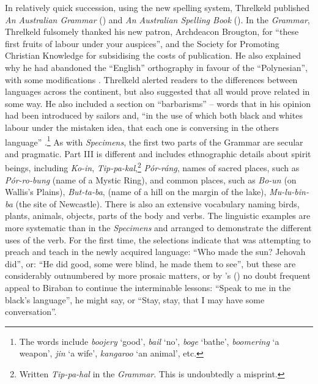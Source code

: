 {In relatively quick succession, using the new spelling system, Threlkeld published \textit{An Australian Grammar} (\citeyear{threlkeld_australian_1834}) and \textit{An Australian Spelling Book} (\citeyear{threlkeld_australian_1836}). In the \textit{Grammar}, Threlkeld fulsomely thanked his new patron, Archdeacon Brougton, for “these first fruits of labour under your auspices”, and the Society for Promoting Christian Knowledge for subsidising the costs of publication. He also explained why he had abandoned the “English” orthography in favour of the “Polynesian”, with some modifications \citep[vii]{threlkeld_australian_1834}. Threlkeld alerted readers to the differences between languages across the continent, but also suggested that all would prove related in some way. He also included a section on “barbarisms” -- words that in his opinion had been introduced by sailors and, “in the use of which both black and whites labour under the mistaken idea, that each one is conversing in the others language” \citep[xi]{threlkeld_australian_1834}.\footnote{The words include \textit{boojery} ‘good’, \textit{bail} ‘no’, \textit{boge} ‘bathe’, \textit{boomering} ‘a weapon’, \textit{jin} ‘a wife’, \textit{kangaroo} ‘an animal’, etc.} As with \textit{Specimens}, the first two parts of the Grammar are secular and pragmatic. Part III is different and includes ethnographic details about spirit beings, including \textit{Ko-in}, \textit{Tip-pa-kal},\footnote{Written \textit{Tip-pa-hal} in the \textit{Grammar}. This is undoubtedly a misprint.} \textit{Pór-ráng}, names of sacred places, such as \textit{Pór-ro-bung} (name of a Mystic Ring), and common places, such as \textit{Bo-un} (on Wallis’s Plains), \textit{But-ta-ba}, (name of a hill on the margin of the lake), \textit{Mu-lu-bin-ba} (the site of Newcastle). There is also an extensive vocabulary naming birds, plants, animals, objects, parts of the body and verbs. The linguistic examples are more systematic than in the \textit{Specimens} and arranged to demonstrate the different uses of the verb. For the first time, the selections indicate that \citet[121]{threlkeld_australian_1834} was attempting to preach and teach in the newly acquired language: “Who made the sun? Jehovah did”, or: “He did good, some were blind, he made them to see”, but these are considerably outnumbered by more prosaic matters, or by \citeauthor{threlkeld_australian_1834}’s (\citeyear[128]{threlkeld_australian_1834}) no doubt frequent appeal to Biraban to continue the interminable lessons: “Speak to me in the black’s language”, he might say, or “Stay, stay, that I may have some conversation”.

}
